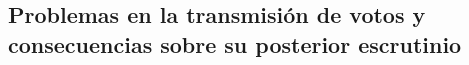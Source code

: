 \documentclass[a4,11pt]{article}
\begin{document}
\subsection{Problemas en la transmisión de votos y consecuencias sobre su posterior escrutinio}

\end{document}

